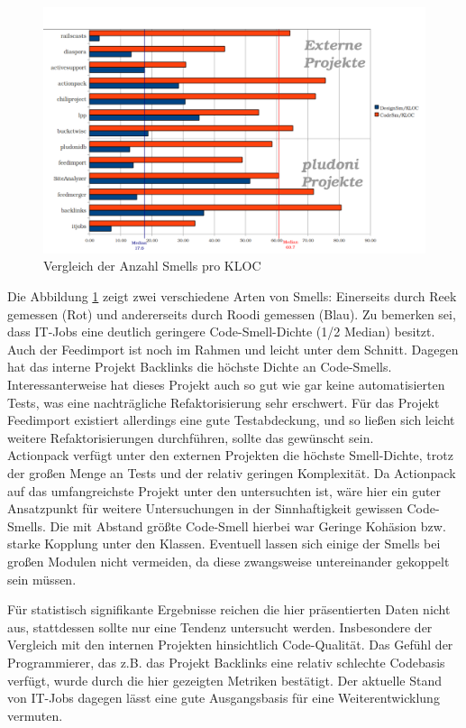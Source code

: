 \begin{figure}[htbp]
 \centering
 \includegraphics[width=\linewidth]{./diagrams/cpm-smells.pdf}
 \caption{Vergleich der Anzahl Smells pro KLOC}
 \label{fig:cpm-smells}
\end{figure}
Die Abbildung \ref{fig:cpm-smells} zeigt zwei verschiedene Arten von Smells: Einerseits durch Reek gemessen (Rot) und andererseits durch Roodi gemessen (Blau). Zu bemerken sei, dass IT-Jobs eine deutlich geringere Code-Smell-Dichte (1/2 Median) besitzt. Auch der Feedimport ist noch im Rahmen und leicht unter dem Schnitt. Dagegen hat das interne Projekt Backlinks die höchste Dichte an Code-Smells. Interessanterweise hat dieses Projekt auch so gut wie gar keine automatisierten Tests, was eine nachträgliche Refaktorisierung sehr erschwert. Für das Projekt Feedimport existiert allerdings eine gute Testabdeckung, und so ließen sich leicht weitere Refaktorisierungen durchführen, sollte das gewünscht sein. \\
Actionpack verfügt unter den externen Projekten die höchste Smell-Dichte, trotz der großen Menge an Tests und der relativ geringen Komplexität. Da Actionpack auf das umfangreichste Projekt unter den untersuchten ist, wäre hier ein guter Ansatzpunkt für weitere Untersuchungen in der Sinnhaftigkeit gewissen Code-Smells. Die mit Abstand größte Code-Smell hierbei war Geringe Kohäsion bzw. starke Kopplung unter den Klassen. Eventuell lassen sich einige der Smells bei großen Modulen nicht vermeiden, da diese zwangsweise untereinander gekoppelt sein müssen.



Für statistisch signifikante Ergebnisse reichen die hier präsentierten Daten nicht aus, stattdessen sollte nur eine Tendenz untersucht werden. Insbesondere der Vergleich mit den internen Projekten hinsichtlich Code-Qualität. Das Gefühl der Programmierer, das z.B. das Projekt Backlinks eine relativ schlechte Codebasis verfügt, wurde durch die hier gezeigten Metriken bestätigt. Der aktuelle Stand von IT-Jobs dagegen lässt eine gute Ausgangsbasis für eine Weiterentwicklung vermuten.



